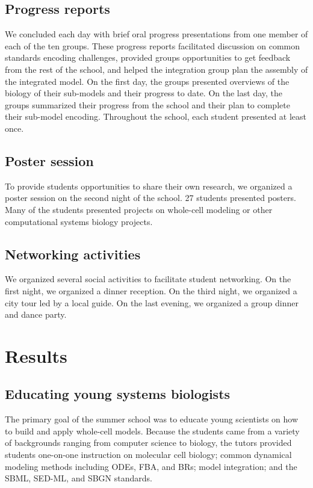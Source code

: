 \documentclass[journal,transmag]{IEEEtran}
\begin{document}
\subsection{Progress reports}
We concluded each day with brief oral progress presentations from one member of each of the ten groups. These progress reports facilitated discussion on common standards encoding challenges, provided groups opportunities to get feedback from the rest of the school, and helped the integration group plan the assembly of the integrated model. On the first day, the groups presented overviews of the biology of their sub-models and their progress to date. On the last day, the groups summarized their progress from the school and their plan to complete their sub-model encoding. Throughout the school, each student presented at least once.

\subsection{Poster session}
To provide students opportunities to share their own research, we organized a poster session on the second night of the school. 
27 students presented posters. Many of the students presented projects on whole-cell modeling or other computational systems biology projects.

\subsection{Networking activities}
We organized several social activities to facilitate student networking. On the first night, we organized a dinner reception. On the third night, we organized a city tour led by a local guide. On the last evening, we organized a group dinner and dance party.

\section{Results}

\subsection{Educating young systems biologists}
The primary goal of the summer school was to educate young scientists on how to build and apply whole-cell models. Because the students came from a variety of backgrounds ranging from computer science to biology, the tutors provided students one-on-one instruction on molecular cell biology; common dynamical modeling methods including ODEs, FBA, and BRs; model integration; and the SBML, SED-ML, and SBGN standards.
\end{document}
